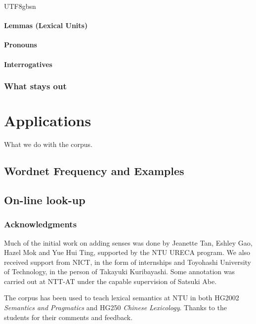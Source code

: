 \documentclass[12pt]{book} %
\begin{document}
\begin{CJK}{UTF8}{gbsn}
\subsubsection{Lemmas (Lexical Units)}


\subsubsection{Pronouns}

\subsubsection{Interrogatives}

\subsection{What stays out}





\chapter{Applications}

What we do with the corpus.

\section{Wordnet Frequency and Examples}

\section{On-line look-up}



\subsection*{Acknowledgments}

Much of the initial work on adding senses was done by Jeanette Tan,
Eshley Gao, Hazel Mok and Yue Hui Ting, supported by the NTU URECA
program.  We also received support from NICT, in the form of
internships and Toyohashi University of Technology, in the person of
Takayuki Kuribayashi.  Some annotation was carried out at NTT-AT under
the capable supervision of Satsuki Abe.

The corpus has been used to teach lexical semantics at NTU in both
HG2002 \textit{Semantics and Pragmatics} and HG250 \textit{Chinese
  Lexicology}.  Thanks to the students for their comments and
feedback.  


\end{CJK}
\end{document}
